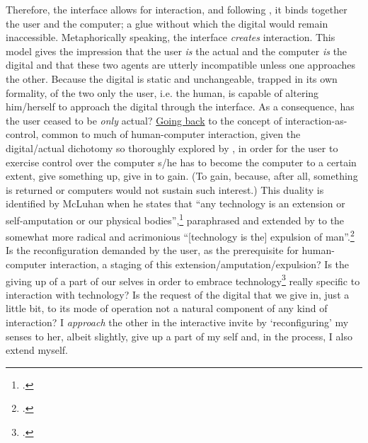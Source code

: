 \label{sec:interaction-digital-2}
Therefore, the interface allows for interaction, and following \citeauthor{evens05}, it binds together the user and the computer; a glue without which the digital would remain inaccessible. Metaphorically speaking, the interface \emph{creates} interaction. This model gives the impression that the user \emph{is} the actual and the computer \emph{is} the digital and that these two agents are utterly incompatible unless one approaches the other. Because the digital is static and unchangeable, trapped in its own formality, of the two only the user, i.e. the human, is capable of altering him/herself to approach the digital through the interface. As a consequence, has the user ceased to be \emph{only} actual? \hyperlink{sec:inter-defin:par4}{Going back} to the concept of interaction-as-control, common to much of human-computer interaction, given the digital/actual dichotomy so thoroughly explored by \citeauthor{evens05}, in order for the user to exercise control over the computer s/he has to become the computer to a certain extent, give something up, give in to gain. (To gain, because, after all, something is returned or computers would not sustain such interest.) This duality is identified by McLuhan when he states that ``any technology is an extension or self-amputation or our physical bodies'',\footcite[49]{mcluhan01} paraphrased and extended by \citeauthor{baudrillard02} to the somewhat more radical and acrimonious ``[technology is the] expulsion of man''.\footcite[35]{baudrillard96} Is the reconfiguration demanded by the user, as the prerequisite for human-computer interaction, a staging of this extension/amputation/expulsion? Is the giving up of a part of our selves in order to embrace technology\footcite[McLuhan writes that to ``behold, use or perceive any extension of ourselves in technological form is necessarily to embrace it''.][49]{mcluhan01} really specific to interaction with technology? Is the request of the digital that we give in, just a little bit, to its mode of operation not a natural component of any kind of interaction? I \emph{approach} the other in the interactive invite by `reconfiguring' my senses to her, albeit slightly, give up a part of my self and, in the process, I also extend myself.

